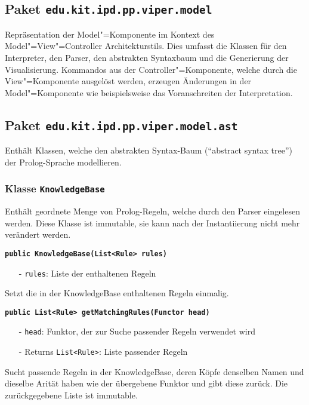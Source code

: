 \documentclass[parskip=full,11pt,twoside]{scrartcl}
\begin{document}
\subsection{Paket \texttt{edu.kit.ipd.pp.viper.model}}

Repräsentation der Model"=Komponente im Kontext des Model"=View"=Controller Architekturstils. Dies umfasst die Klassen für den Interpreter, den Parser, den abstrakten Syntaxbaum und die Generierung der Visualisierung. Kommandos aus der Controller"=Komponente, welche durch die View"=Komponente ausgelöst werden, erzeugen Änderungen in der Model"=Komponente wie beispielsweise das Voranschreiten der Interpretation.

\subsection{Paket \texttt{edu.kit.ipd.pp.viper.model.ast}}

Enthält Klassen, welche den abstrakten Syntax-Baum (\enquote{abstract syntax tree}) der Prolog-Sprache modellieren.

\subsubsection{Klasse \texttt{KnowledgeBase}}
Enthält geordnete Menge von Prolog-Regeln, welche durch den Parser eingelesen werden. Diese Klasse ist immutable, sie kann nach der Instantiierung nicht mehr verändert werden.

\textbf{\texttt{public KnowledgeBase(List<Rule> rules)}}
\begin{itemize}[noitemsep]
	\item[-] \texttt{rules}: Liste der enthaltenen Regeln
\end{itemize}
Setzt die in der KnowledgeBase enthaltenen Regeln einmalig.

\textbf{\texttt{public List<Rule> getMatchingRules(Functor head)}}
\begin{itemize}[noitemsep]
	\item[-] \texttt{head}: Funktor, der zur Suche passender Regeln verwendet wird
	\item[-] Returns \texttt{List<Rule>}: Liste passender Regeln
\end{itemize}
Sucht passende Regeln in der KnowledgeBase, deren Köpfe denselben Namen und dieselbe Arität haben wie der übergebene Funktor und gibt diese zurück. Die zurückgegebene Liste ist immutable.
\end{document}
